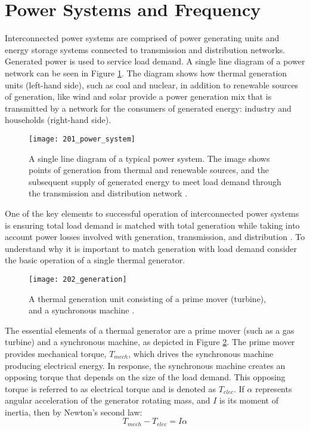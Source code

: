\section{Power Systems and Frequency}
Interconnected power systems are comprised of power generating units and energy storage systems connected to transmission and distribution networks. Generated power is used to service load demand. A single line diagram of a power network can be seen in Figure \ref{fig:201_power_system}. The diagram shows how thermal generation units (left-hand side), such as coal and nuclear, in addition to renewable sources of generation, like wind and solar provide a power generation mix that is transmitted by a network for the consumers of generated energy: industry and households (right-hand side).
\begin{figure}[ht]
	\centering
	\texttt{[image: 201\_power\_system]}
	\caption[High level overview of a power network]{A single line diagram of a typical power system. The image shows points of generation from thermal and renewable sources, and the subsequent supply of generated energy to meet load demand through the transmission and distribution network \cite{Glavic2019}.}
	\label{fig:201_power_system}
\end{figure}

One of the key elements to successful operation of interconnected power systems is ensuring total load demand is matched with total generation while taking into account power losses involved with generation, transmission, and distribution \cite{Wood2013}. To understand why it is important to match generation with load demand consider the basic operation of a single thermal generator. 
\begin{figure}[h]
	\centering
	\texttt{[image: 202\_generation]}
	\caption[Turbine generator model]{A thermal generation unit consisting of a prime mover (turbine), and a synchronous machine \cite{Wood2013}.}
	\label{fig:202_generation}
\end{figure}

The essential elements of a thermal generator are a prime mover (such as a gas turbine) and a synchronous machine, as depicted in Figure \ref{fig:202_generation}. The prime mover provides mechanical torque, $T_{mech}$, which drives the synchronous machine producing electrical energy. In response, the synchronous machine creates an opposing torque that depends on the size of the load demand. This opposing torque is referred to as electrical torque and is denoted as $T_{elec}$. If $\alpha$ represents angular acceleration of the generator rotating mass, and $I$ is its moment of inertia, then by Newton's second law:
\begin{equation}
	T_{mech} - T_{elec} = I \alpha \label{eq:201}
\end{equation}

